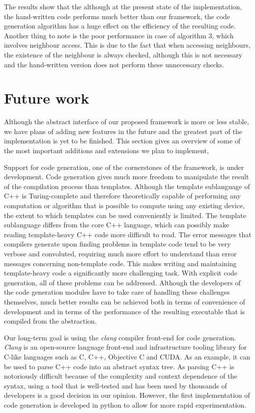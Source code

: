 \documentclass[fontsize=11pt, appendixprefix=true]{scrreprt}
\begin{document}
The results show that the although at the present state of the implementation,
the hand-written code performs much better than our framework, the code
generation algorithm has a huge effect on the efficiency of the resulting
code. Another thing to note is the poor performance in case of algorithm 3,
which involves neighbour access. This is due to the fact that when accessing
neighbours, the existence of the neighbour is always checked, although this is
not necessary and the hand-written version does not perform these unnecessary
checks.

\chapter{Future work}

Although the abstract interface of our proposed framework is more or less
stable, we have plans of adding new features in the future and the greatest part
of the implementation is yet to be finished. This section gives an overview of
some of the most important additions and extensions we plan to implement,

Support for code generation, one of the cornerstones of the framework, is under
development. Code generation gives much more freedom to manipulate the result of
the compilation process than templates. Although the template sublanguage of C++
is Turing-complete and therefore theoretically capable of performing any
computation or algorithm that is possible to compute using any existing device,
the extent to which templates can be used conveniently is limited. The template
sublanguage differs from the core C++ language, which can possibly make reading
template-heavy C++ code more difficult to read. The error messages that
compilers generate upon finding problems in template code tend to be very
verbose and convoluted, requiring much more effort to understand than error
messages concerning non-template code. This makes writing and maintaining
template-heavy code a significantly more challenging task. With explicit code
generation, all of these problems can be addressed. Although the developers of
the code generation modules have to take care of handling these challenges
themselves, much better results can be achieved both in terms of convenience of
development and in terms of the performance of the resulting executable that is
compiled from the abstraction.

Our long-term goal is using the \textit{clang} compiler front-end for code
generation. \textit{Clang} is an open-source language front-end and
infrastructure tooling library for C-like languages such as C, C++, Objective C
and CUDA. As an example, it can be used to parse C++ code into an abstract
syntax tree. As parsing C++ is notoriously difficult because of the complexity
and context dependence of the syntax, using a tool that is well-tested and has
been used by thousands of developers is a good decision in our opinion. However,
the first implementation of code generation is developed in python to allow for
more rapid experimentation.
\end{document}
